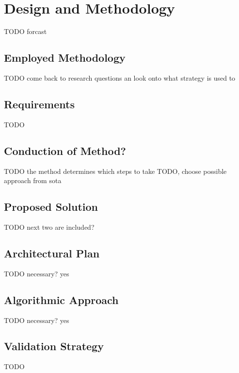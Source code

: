 \chapter{Design and Methodology}
\label{chap:design}
TODO forcast



\section{Employed Methodology}
TODO
come back to research questions an look onto what strategy is used to 

\section{Requirements}
TODO

\section{Conduction of Method?}
TODO the method determines which steps to take
TODO, choose possible approach from sota

\section{Proposed Solution}
TODO next two are included?

\section{Architectural Plan}
TODO necessary? yes

\section{Algorithmic Approach}
TODO necessary? yes

\section{Validation Strategy}

TODO